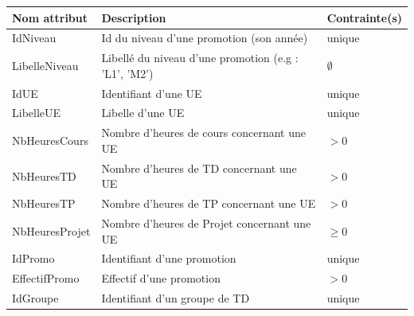 \documentclass{article}
\begin{document}
\hspace*{-0.6in}
\begin{tabular}{|p{4cm}|p{8cm}|p{5cm}|}
  \hline
  Nom attribut & Description & Contrainte(s) \\
  \hline

  IdNiveau & Id du niveau d'une promotion (son année) & unique \\

  LibelleNiveau & Libellé du niveau d'une promotion (e.g : 'L1', 'M2') & $\emptyset$ \\

  IdUE & Identifiant d'une UE & unique \\

  LibelleUE & Libelle d'une UE & unique \\

  NbHeuresCours & Nombre d'heures de cours concernant une UE & $> 0$ \\

  NbHeuresTD & Nombre d'heures de TD concernant une UE & $> 0$ \\

  NbHeuresTP & Nombre d'heures de TP concernant une UE & $> 0$ \\

  NbHeuresProjet & Nombre d'heures de Projet concernant une UE & $\geq 0$ \\





  IdPromo & Identifiant d'une promotion & unique \\

  EffectifPromo & Effectif d'une promotion & $> 0$ \\

  IdGroupe & Identifiant d'un groupe de TD & unique \\


\end{tabular}
\end{document}
